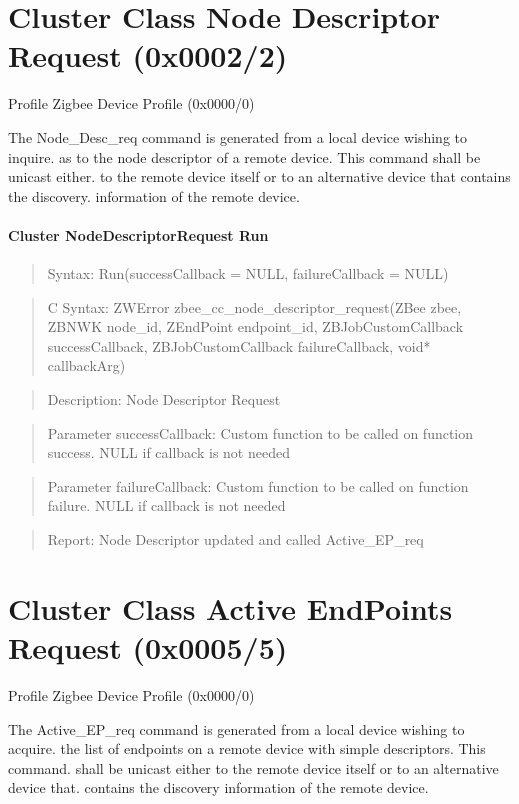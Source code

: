 

\section{Cluster Class Node Descriptor Request (0x0002/2)}

Profile Zigbee Device Profile (0x0000/0)

The Node\_Desc\_req command is generated from a local device wishing to inquire. as to the node descriptor of a remote device. This command shall be unicast either. to the remote device itself or to an alternative device that contains the discovery. information of the remote device.
\paragraph{Cluster NodeDescriptorRequest Run}
\begin{quote}Syntax: Run(successCallback = NULL, failureCallback = NULL)\end{quote}
\begin{quote}C Syntax: ZWError zbee\_cc\_node\_descriptor\_request(ZBee zbee, ZBNWK node\_id, ZEndPoint endpoint\_id, ZBJobCustomCallback successCallback, ZBJobCustomCallback failureCallback, void* callbackArg)\end{quote}
\begin{quote}Description: Node Descriptor Request\end{quote}
\begin{quote}Parameter successCallback: Custom function to be called on function success. NULL if callback is not needed\end{quote}
\begin{quote}Parameter failureCallback: Custom function to be called on function failure. NULL if callback is not needed\end{quote}
\begin{quote}Report: Node Descriptor updated and called Active\_EP\_req\end{quote}


\section{Cluster Class Active EndPoints Request (0x0005/5)}

Profile Zigbee Device Profile (0x0000/0)

The Active\_EP\_req command is generated from a local device wishing to acquire. the list of endpoints on a remote device with simple descriptors. This command. shall be unicast either to the remote device itself or to an alternative device that. contains the discovery information of the remote device.
